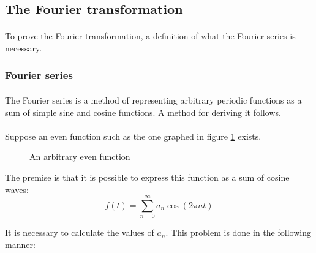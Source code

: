 \documentclass{article}
\begin{document}
\subsection{The Fourier transformation}

\paragraph*{}
To prove the Fourier transformation, a definition of what the Fourier series 
is necessary.

\subsubsection{Fourier series}

\paragraph*{}
The Fourier series is a method of representing arbitrary periodic functions as 
a sum of simple sine and cosine functions. A method for deriving it follows.

\paragraph*{}
Suppose an even function such as the one graphed in figure 
\ref{fig:odd-arb-func} exists.
\begin{figure}[ht]
	\centering
	\caption{An arbitrary even function}
	\label{fig:odd-arb-func}
\end{figure}

The premise is that it is possible to express this function as a sum of cosine 
waves:
$$f(t) = \sum^{\infty}_{n=0}a_n \cos(2 \pi n t)$$

It is necessary to calculate the values of $a_n$. This problem is done in the 
following manner:
\end{document}
